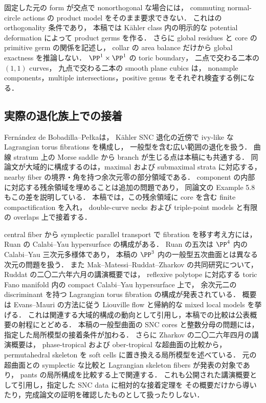 固定した元の form が交点で nonorthogonal な場合には，
commuting normal-circle actions の product model をそのまま要求できない．
これは\cite[Proposition 2.5]{BSV}の orthogonality 条件であり，
本稿では Kähler class 内の明示的な potential deformation によって product germs を作る．
さらに global residues と core の primitive germ の関係を記述し，
collar の area balance だけから global exactness を推論しない．
$\PP^1\times\PP^1$ の toric boundary，
二点で交わる二本の $(1,1)$ curves，
九点で交わる二本の smooth plane cubics は，
nonample components，multiple intersections，positive genus をそれぞれ検査する例になる．

\subsection{実際の退化族上での接着}

Fernández de Bobadilla--Pełka\cite[Proposition 5.6, Theorem 6.14]{FBP}は，
Kähler SNC 退化の近傍で ivy-like な Lagrangian torus fibrations を構成し，
一般型を含む広い範囲の退化を扱う．
曲線 stratum 上の Morse saddle から branch が生じる点は本稿にも共通する．
同論文が大域的に構成するのは，maximal および submaximal strata に対応する，
nearby fiber の境界・角を持つ余次元零の部分領域である．
component の内部に対応する残余領域を埋めることは追加の問題であり，
同論文の Example 5.8 もこの差を説明している．
本稿では，この残余領域に core を含む finite compactification を入れ，
double-curve necks および triple-point models と有限の overlaps 上で接着する．

central fiber から symplectic parallel transport で fibration を移す考え方には，
Ruan の Calabi--Yau hypersurface の構成\cite{Ruan}がある．
Ruan の五次は $\PP^4$ 内の Calabi--Yau 三次元多様体であり，
本稿の $\PP^3$ 内の一般型五次曲面とは異なる次元の問題を扱う．
また Mak--Matessi--Ruddat--Zharkov の共同研究について，
Ruddat の二〇二六年六月の講演概要\cite{RuddatAnnouncement2026}では，
reflexive polytope に対応する toric Fano manifold 内の compact Calabi--Yau hypersurface 上で，
余次元二の discriminant を持つ Lagrangian torus fibration の構成が発表されている．
概要は Evans--Mauri の方法に従う Liouville flow と帰納的な mixed local models を挙げる．
これは関連する大域的構成の動向として引用し，本稿での比較は公表概要の射程にとどめる．
本稿の一般型曲面の SNC cores と整数分母の問題には，指定した局所模型の接着条件が加わる．
さらに Zharkov の二〇二六年四月の講演概要\cite{ZharkovSoftCells2026}は，
phase-tropical および ober-tropical な超曲面の比較から，
permutahedral skeleton を soft cells に置き換える局所模型を述べている．
元の超曲面との symplectic な比較と Lagrangian skeleton fibers が発表の対象であり，
pants の局所構成を比較する上で関連する．
これも公開された講演概要として引用し，指定した SNC data に相対的な接着定理を
その概要だけから導いたり，完成論文の証明を確認したものとして扱ったりしない．


